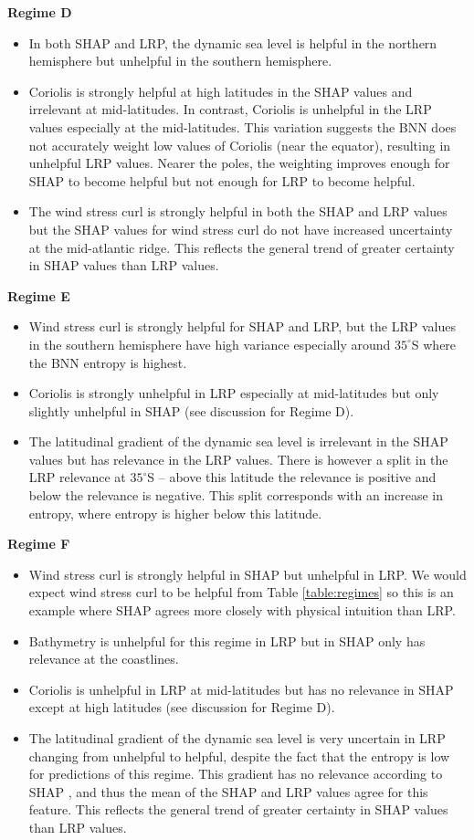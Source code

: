 \documentclass[a4paper]{article}
\begin{document}
\textbf{Regime D}
\begin{itemize}
    \item In both SHAP and LRP, the dynamic sea level is helpful in the northern hemisphere but unhelpful in the southern hemisphere.
    \item Coriolis is strongly helpful at high latitudes in the SHAP values and irrelevant at mid-latitudes. In contrast, Coriolis is unhelpful in the LRP values especially at the mid-latitudes.  This variation suggests the BNN does not accurately weight low values of Coriolis (near the equator), resulting in unhelpful LRP values. Nearer the poles, the weighting improves enough for SHAP to become helpful but not enough for LRP to become helpful.
    \item The wind stress curl is strongly helpful in both the SHAP and LRP values but the SHAP values for wind stress curl do not have increased uncertainty at the mid-atlantic ridge. This reflects the general trend of greater certainty in SHAP values than LRP values.
\end{itemize}

\textbf{Regime E}
\begin{itemize}
    \item Wind stress curl is strongly helpful for SHAP and LRP, but the LRP values in the southern hemisphere have high variance especially around $35^{\circ}$S where the BNN entropy is highest.
    \item Coriolis is strongly unhelpful in LRP especially at mid-latitudes but only slightly unhelpful in SHAP (see discussion for Regime D).
    \item The latitudinal gradient of the dynamic sea level is irrelevant in the SHAP values but has relevance in the LRP values. There is however a split in the LRP relevance at $35^{\circ}$S -- above this latitude the relevance is positive and below the relevance is negative. This split corresponds with an increase in entropy, where entropy is higher below this latitude.
\end{itemize}

\textbf{Regime F}
\begin{itemize}
    \item Wind stress curl is strongly helpful in SHAP but unhelpful in LRP. We would expect wind stress curl to be helpful from Table \ref{table:regimes} so this is an example where SHAP agrees more closely with physical intuition than LRP.
    \item Bathymetry is unhelpful for this regime in LRP but in SHAP only has relevance at the coastlines. 
    \item Coriolis is unhelpful in LRP at mid-latitudes but has no relevance in SHAP except at high latitudes (see discussion for Regime D).
    \item The latitudinal gradient of the dynamic sea level is very uncertain in LRP changing from unhelpful to helpful, despite the fact that the entropy is low for predictions of this regime. This gradient has no relevance according to SHAP , and thus the mean of the SHAP and LRP values agree for this feature. This reflects the general trend of greater certainty in SHAP values than LRP values.
\end{itemize}
  
\end{document}

